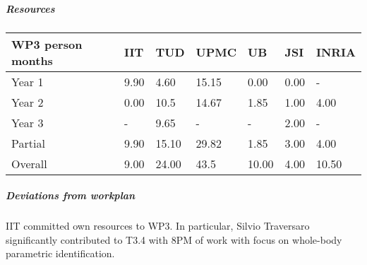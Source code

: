 
\subparagraph{Resources}

\begin{center}
\begin{tabular}{|C{1.5cm}|C{1.5cm}|C{1.5cm}|C{2cm}|C{2cm}|C{2cm}|C{2cm}|}
\hline
\footnotesize \textbf{WP3 person months} & \footnotesize \textbf{IIT}&\footnotesize \textbf{TUD}&\footnotesize \textbf{UPMC}& \footnotesize \textbf{UB} &\footnotesize \textbf{JSI} &\footnotesize \textbf{INRIA} \\ \hline
\footnotesize Year 1 &  9.90 & 4.60 & 15.15 & 0.00 & 0.00 &  -   \\  \hline
\footnotesize Year 2 &  0.00 & 10.5 & 14.67 & 1.85 & 1.00 &  4.00  \\  \hline
\footnotesize Year 3 &  -    & 9.65 & -     & -    & 2.00 &  -     \\  \hline
\footnotesize Partial &  9.90 & 15.10 & 29.82 & 1.85 & 3.00 & 4.00 \\ \hline \hline
\footnotesize Overall &  9.00 & 24.00 & 43.5 & 10.00 & 4.00 & 10.50 \\ \hline
\end{tabular}
\end{center}

\subparagraph{Deviations from workplan} 
IIT committed own resources to WP3. In particular, Silvio Traversaro significantly contributed to T3.4 with 8PM of work with focus on whole-body parametric identification. 
